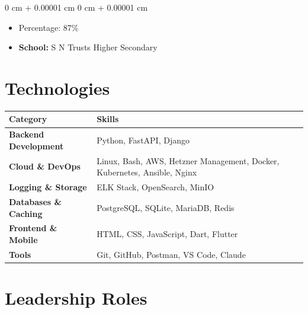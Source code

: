 \documentclass[10pt, letterpaper]{article}
\newenvironment{highlights}{ \begin{itemize}[ topsep=0.10 cm, parsep=0.10 cm, partopsep=0pt,
itemsep=0pt, leftmargin=0 cm + 10pt ] }{ \end{itemize} } %
\newenvironment{onecolentry}{ \begin{adjustwidth}{ 0 cm + 0.00001 cm }{ 0 cm + 0.00001 cm }
}{ \end{adjustwidth} } %
\begin{document}
	\vspace{0.10 cm}
	\begin{onecolentry}
		\begin{highlights}
			\item Percentage: 87\% \item \textbf{School:} S N Trusts Higher Secondary
		\end{highlights}
	\end{onecolentry}
	\vspace{0.3 cm}

	\section{Technologies}

	\vspace{0.2 cm}

	\begin{table}[ht] %
		\centering
		\renewcommand{\arraystretch}{1.5} %
		\begin{tabular}{|l|p{10cm}|}
			\hline
			\textbf{Category}            & \textbf{Skills}                                                                                         \\
			\hline
			\textbf{Backend Development} & Python, FastAPI, Django \\
			\hline
			\textbf{Cloud \& DevOps} & Linux, Bash, AWS, Hetzner Management, Docker, Kubernetes, Ansible, Nginx \\
			\hline
			\textbf{Logging \& Storage} & ELK Stack, OpenSearch, MinIO \\
			\hline
			\textbf{Databases \& Caching} & PostgreSQL, SQLite, MariaDB, Redis \\
			\hline
			\textbf{Frontend \& Mobile} & HTML, CSS, JavaScript, Dart, Flutter \\
			\hline
			\textbf{Tools} & Git, GitHub, Postman, VS Code, Claude \\
			\hline
		\end{tabular}
	\end{table}

	\section{Leadership Roles}
\end{document}
